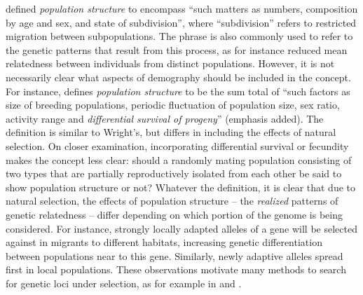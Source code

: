 \documentclass[11pt, oneside]{article}   	%
\newif\ifsubmission
\newcommand\citet{\cite}
\newcommand{\citetx}[2][]{\ifsubmission#1 \cite{#2}\else\citet{#2}\fi}
\begin{document}
\citetx[Wright]{wright1949genetical} defined \emph{population structure} to encompass ``such matters as numbers, composition by age and sex, and state of subdivision'',
where ``subdivision'' refers to restricted migration between subpopulations.
The phrase is also commonly used to refer to the genetic patterns that result from this process,
as for instance reduced mean relatedness between individuals from distinct populations.
However, it is not necessarily clear what aspects of demography should be included in the concept.
For instance, 
\citetx[Blair]{blair1943population} defines \emph{population structure} to be the sum total of
``such factors as size of breeding populations, periodic fluctuation of population size, sex ratio, activity range and \emph{differential survival of progeny}'' (emphasis added).
The definition is similar to Wright's, but differs in including the effects of natural selection.
On closer examination, incorporating differential survival or fecundity makes the concept less clear:
should a randomly mating population consisting of two types that are partially reproductively isolated from each other
be said to show population structure or not?
Whatever the definition,
it is clear that due to natural selection, the effects of population structure --
the \emph{realized} patterns of genetic relatedness --
differ depending on which portion of the genome is being considered.
For instance, strongly locally adapted alleles of a gene will be selected against in migrants to different habitats,
increasing genetic differentiation between populations near to this gene.
Similarly, newly adaptive alleles spread first in local populations.
These observations motivate many methods to search for genetic loci under selection,
as for example in \citet{huertasnchez2013genetic} and \citet{martin2016natural}.


\end{document}
